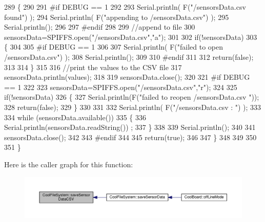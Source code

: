 \begin{DoxyCode}
289     \{
290 
291 \textcolor{preprocessor}{    #if DEBUG == 1}
292     
293         Serial.println( F(\textcolor{stringliteral}{"/sensorsData.csv  found"}) );
294         Serial.println( F(\textcolor{stringliteral}{"appending to /sensorsData.csv"}) );
295         Serial.println();
296     
297 \textcolor{preprocessor}{    #endif}
298 
299         \textcolor{comment}{//append to file}
300         sensorsData=SPIFFS.open(\textcolor{stringliteral}{"/sensorsData.csv"},\textcolor{stringliteral}{"a"});
301         
302         \textcolor{keywordflow}{if}(!sensorsData)
303         \{
304         
305 \textcolor{preprocessor}{        #if DEBUG == 1}
306             
307             Serial.println( F(\textcolor{stringliteral}{"failed to open /sensorsData.csv"}) );
308             Serial.println();
309 
310 \textcolor{preprocessor}{        #endif}
311             
312             \textcolor{keywordflow}{return}(\textcolor{keyword}{false});
313         
314         \}
315 
316         \textcolor{comment}{//print the values to the CSV file}
317         sensorsData.println(values);
318         
319         sensorsData.close();
320 
321 \textcolor{preprocessor}{    #if DEBUG == 1}
322 
323         sensorsData=SPIFFS.open(\textcolor{stringliteral}{"/sensorsData.csv"},\textcolor{stringliteral}{"r"});
324         
325         \textcolor{keywordflow}{if}(!sensorsData)
326         \{
327             Serial.println(F(\textcolor{stringliteral}{"failed to reopen /sensorsData.csv "}));
328             \textcolor{keywordflow}{return}(\textcolor{keyword}{false});      
329         \}
330 
331         
332         Serial.println( F(\textcolor{stringliteral}{"/sensorsData.csv : "}) );
333 
334         \textcolor{keywordflow}{while} (sensorsData.available()) 
335         \{
336             Serial.println(sensorsData.readString()) ;
337         \}
338         
339         Serial.println();
340         
341         sensorsData.close();
342         
343 \textcolor{preprocessor}{    #endif      }
344         
345         \textcolor{keywordflow}{return}(\textcolor{keyword}{true});
346     
347     \}   
348 
349 
350 
351 \}
\end{DoxyCode}
Here is the caller graph for this function\+:\nopagebreak
\begin{figure}[H]
\begin{center}
\leavevmode
\includegraphics[width=350pt]{classCoolFileSystem_ab78704d5d21ce10fc6f1138ab5ab46c8_icgraph}
\end{center}
\end{figure}
\mbox{\label{classCoolFileSystem_adfa8e2e80641ae6f0cceabd348a9b841}} 

